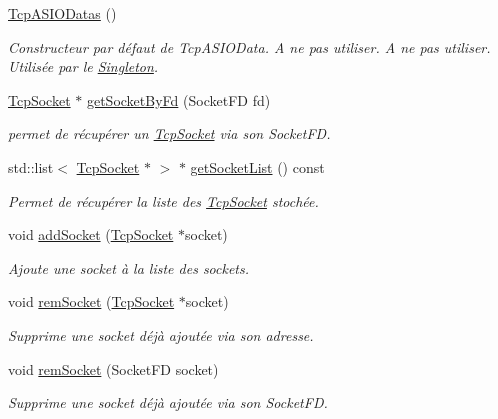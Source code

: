 \begin{DoxyCompactItemize}
\item 
\hypertarget{classmognetwork_1_1_tcp_a_s_i_o_datas_aefa4425a076fbfe35ff9420e63aa5a41}{\hyperlink{classmognetwork_1_1_tcp_a_s_i_o_datas_aefa4425a076fbfe35ff9420e63aa5a41}{Tcp\-A\-S\-I\-O\-Datas} ()}\label{classmognetwork_1_1_tcp_a_s_i_o_datas_aefa4425a076fbfe35ff9420e63aa5a41}

\begin{DoxyCompactList}\small\item\em Constructeur par défaut de Tcp\-A\-S\-I\-O\-Data. A ne pas utiliser.  A ne pas utiliser. Utilisée par le \hyperlink{classmognetwork_1_1_singleton}{Singleton}. \end{DoxyCompactList}\item 
\hyperlink{classmognetwork_1_1_tcp_socket}{Tcp\-Socket} $\ast$ \hyperlink{classmognetwork_1_1_tcp_a_s_i_o_datas_a97b9895517d49687c35663ec4de5453e}{get\-Socket\-By\-Fd} (Socket\-F\-D fd)
\begin{DoxyCompactList}\small\item\em permet de récupérer un \hyperlink{classmognetwork_1_1_tcp_socket}{Tcp\-Socket} via son Socket\-F\-D. \end{DoxyCompactList}\item 
std\-::list$<$ \hyperlink{classmognetwork_1_1_tcp_socket}{Tcp\-Socket} $\ast$ $>$ $\ast$ \hyperlink{classmognetwork_1_1_tcp_a_s_i_o_datas_a7c5c65122f57d2186fb735416a790763}{get\-Socket\-List} () const 
\begin{DoxyCompactList}\small\item\em Permet de récupérer la liste des \hyperlink{classmognetwork_1_1_tcp_socket}{Tcp\-Socket} stochée. \end{DoxyCompactList}\item 
void \hyperlink{classmognetwork_1_1_tcp_a_s_i_o_datas_aa52b9fb9195d372f5b647d7631cf5b72}{add\-Socket} (\hyperlink{classmognetwork_1_1_tcp_socket}{Tcp\-Socket} $\ast$socket)
\begin{DoxyCompactList}\small\item\em Ajoute une socket à la liste des sockets. \end{DoxyCompactList}\item 
void \hyperlink{classmognetwork_1_1_tcp_a_s_i_o_datas_a49a15b15392fadb168ae376c72b7f9e0}{rem\-Socket} (\hyperlink{classmognetwork_1_1_tcp_socket}{Tcp\-Socket} $\ast$socket)
\begin{DoxyCompactList}\small\item\em Supprime une socket déjà ajoutée via son adresse. \end{DoxyCompactList}\item 
void \hyperlink{classmognetwork_1_1_tcp_a_s_i_o_datas_a4699eb56dd2868e62babcea3d2b6da00}{rem\-Socket} (Socket\-F\-D socket)
\begin{DoxyCompactList}\small\item\em Supprime une socket déjà ajoutée via son Socket\-F\-D. \end{DoxyCompactList}\end{DoxyCompactItemize}
